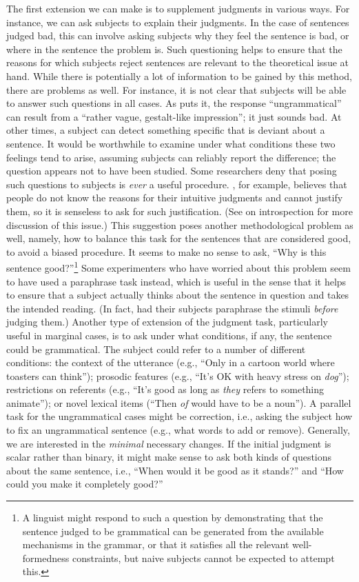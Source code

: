 The first extension we can make is to supplement judgments in various ways. For instance, we can ask subjects to explain their judgments. In the case of sentences judged bad, this can involve asking subjects why they feel the sentence is bad, or where in the sentence the problem is. Such questioning helps to ensure that the reasons for which subjects reject sentences are relevant to the theoretical issue at hand. While there is potentially a lot of information to be gained by this method, there are problems as well. For instance, it is not clear that subjects will be able to answer such questions in all cases. As \citet[110]{Birdsong1989} puts it, the response
``ungrammatical'' can result from a ``rather vague, gestalt-like impression''; it just sounds bad. At other times, a subject can detect something specific that is deviant about a sentence. It would be worthwhile to examine under what conditions these two feelings tend to arise, assuming subjects can reliably
report  the difference;  the question  appears  not to have been  studied. Some researchers deny that posing such questions to subjects is \textit{ever} a useful procedure. \citet{Botha1981}, for example, believes that people do not know the reasons for their intuitive judgments  and cannot justify  them,  so it is senseless  to  ask for  such justification.  (See  on introspection for more discussion of this issue.) This suggestion poses another methodological  problem as well, namely, how to balance this task for the sentences that are considered good, to avoid a biased procedure. It seems to make no sense to ask, ``Why is this sentence good?''\footnote{A linguist might respond to such a question by demonstrating that the sentence judged to be grammatical can be generated from the available mechanisms in the grammar, or that it satisfies all the relevant well-formedness constraints, but naive subjects cannot be expected to attempt this.}
Some experimenters  who have worried  about this problem  seem to have used a paraphrase task instead, which is useful in the sense that it helps to ensure that a subject actually thinks about the sentence in question and takes the intended reading. (In fact, \citet{ConnorsEtAl1993} had their  subjects paraphrase  the stimuli \textit{before} judging them.) Another type of extension of the judgment task, particularly useful  in marginal  cases, is to ask under  what  conditions, if  any, the sentence could be grammatical. The subject could refer to a number  of different  conditions: the context of the utterance (e.g., ``Only in a cartoon world where toasters can think''); prosodic features (e.g., ``It's OK with heavy stress on \textit{dog}''); restrictions on referents  (e.g., ``It's good as long as \textit{they} refers to something animate''); or novel lexical items (``Then \textit{of} would have to be a noun''). A parallel task for the ungrammatical cases might be correction, i.e., asking the subject how to fix an ungrammatical sentence (e.g., what words to add or remove). Generally, we are interested in the \textit{minimal} necessary  changes. If the initial judgment  is scalar rather than binary, it might make sense to ask both kinds of questions about the same sentence, i.e., ``When would it be good as it stands?'' and ``How could you make it completely  good?''

